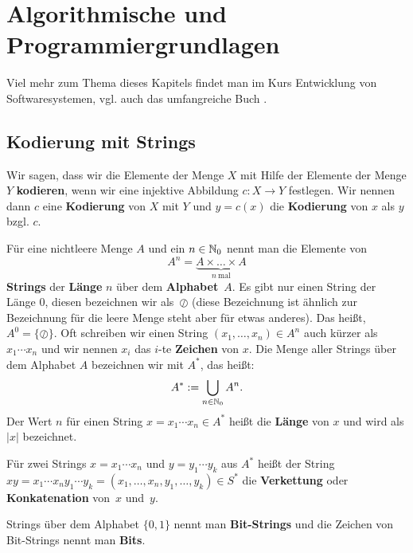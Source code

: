 \chapter{Algorithmische und Programmiergrundlagen}

Viel mehr zum Thema dieses Kapitels findet man im Kurs Entwicklung von Softwaresystemen, vgl. auch das umfangreiche Buch \cite{GS11}. 

\section{Kodierung mit Strings} 

\begin{defn}
Wir sagen, dass wir die Elemente der  Menge $X$ mit Hilfe der Elemente der Menge $Y$ \textbf{kodieren}, wenn wir eine  injektive Abbildung $c : X \to Y$ festlegen. Wir nennen dann $c$ eine \textbf{Kodierung} von $X$ mit $Y$ und $y=c(x)$ die \textbf{Kodierung} von $x$ als $y$ bzgl. $c$.  
\end{defn}

\begin{defn} 
	Für eine nichtleere Menge $A$ und ein $n \in \mathbb{N}_0$ nennt man die Elemente von 
	\[
		A^n = \underbrace{A\times\ldots\times A}_{n \ \text{mal}}
	\]
	\textbf{Strings} der \textbf{Länge} $n$ über dem \textbf{Alphabet}~$A$.
	Es gibt nur einen String der Länge $0$, diesen bezeichnen wir als~$\oslash$ (diese Bezeichnung ist ähnlich zur Bezeichnung für die leere Menge steht aber für etwas anderes). 
	Das heißt, $A^0 = \{\oslash\}$. 
	Oft schreiben wir einen String $(x_1,\ldots,x_n) \in A^n$ auch kürzer als $x_1 \cdots x_n$ und wir nennen $x_i$ das $i$-te \textbf{Zeichen} von $x$. 
	Die Menge aller Strings über dem Alphabet $A$ bezeichnen wir mit $A^\ast$, das heißt: 
	\[
		A^\ast := \bigcup_{n \in \mathbb{N}_0} A^n.
	\]
	Der Wert $n$ für einen String $x = x_1 \cdots x_n \in A^\ast$ heißt die \textbf{Länge} von $x$ und wird als $|x|$ bezeichnet. 
\end{defn}

\begin{defn} 
		Für zwei Strings $x=x_1 \cdots x_n$ und $y=y_1 \cdots y_k$ aus $A^\ast$ heißt der String $xy = x_1 \cdots x_n y_1 \cdots y_k = (x_1,\ldots,x_n,y_1,\ldots,y_k) \in S^\ast$ die \textbf{Verkettung} oder \textbf{Konkatenation} von~$x$ und~$y$. 
\end{defn} 

\begin{defn} 
		Strings über dem Alphabet $\{0,1\}$ nennt man \textbf{Bit-Strings} und die Zeichen von Bit-Strings nennt man \textbf{Bits}.
\end{defn} 

